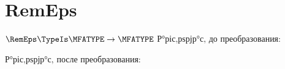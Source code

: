 \section{RemEps}
\begin{frame}{$\RemEps\TypeIs\MFATYPE\to\MFATYPE$}
	Р°ріс‚рѕрјр°с‚ до преобразования:

	Р°ріс‚рѕрјр°с‚ после преобразования:
\end{frame}